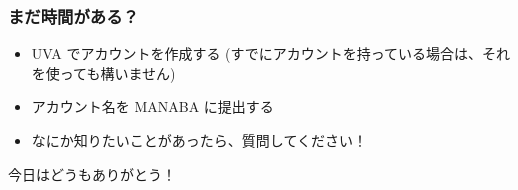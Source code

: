 \documentclass{beamer}
\begin{document}

\begin{frame}
  \frametitle{まだ時間がある？}

  \begin{itemize}
  \item UVA でアカウントを作成する (すでにアカウントを持っている場合は、それを使っても構いません)

    \bigskip

  \item アカウント名を MANABA に提出する

    \bigskip

  \item なにか知りたいことがあったら、質問してください！
  \end{itemize}

  \bigskip

  \begin{center}
    今日はどうもありがとう！
  \end{center}
\end{frame}
\end{document}
